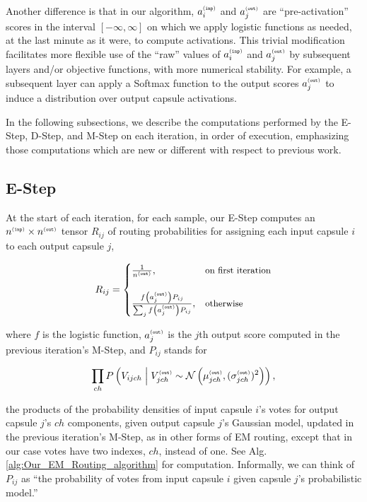 \documentclass[11pt,a4paper]{article}
\begin{document}
Another difference is that in our algorithm, $a^{{\scriptscriptstyle\tt (inp)}}_i$ and $a^{{\scriptscriptstyle\tt (out)}}_j$ are ``pre-activation'' scores in the interval $[-\infty, \infty]$ on which we apply logistic functions as needed, at the last minute as it were, to compute activations. This trivial modification facilitates more flexible use of the ``raw'' values of $a^{{\scriptscriptstyle\tt (inp)}}_i$ and $a^{{\scriptscriptstyle\tt (out)}}_j$ by subsequent layers and/or objective functions, with more numerical stability. For example, a subsequent layer can apply a Softmax function to the output scores $a^{{\scriptscriptstyle\tt (out)}}_j$ to induce a distribution over output capsule activations.

In the following subsections, we describe the computations performed by the E-Step, D-Step, and M-Step on each iteration, in order of execution, emphasizing those computations which are new or different with respect to previous work.

\subsection{E-Step}\label{ssec:E_Step}

At the start of each iteration, for each sample, our E-Step computes an $n^{{\scriptscriptstyle\tt (inp)}} \times n^{{\scriptscriptstyle\tt (out)}}$ tensor $R_{ij}$ of routing probabilities for assigning each input capsule $i$ to each output capsule $j$,

\begin{equation}\label{eq:equation_for_R}
R_{ij} =
\begin{cases}
  \frac{1}{n^{{\scriptscriptstyle\tt (out)}}},
  & \text{\small on first iteration} \\
  \\
  \frac{f\left(a^{{\scriptscriptstyle\tt (out)}}_j\right) P_{ij}}
  {\sum_j f\left(a^{{\scriptscriptstyle\tt (out)}}_j\right) P_{ij}},
  & \text{\small otherwise}
\end{cases}
\end{equation}

where $f$ is the logistic function, $a^{{\scriptscriptstyle\tt (out)}}_j$ is the $j$th output score computed in the previous iteration's M-Step, and $P_{ij}$ stands for

\begin{equation}
\prod_{ch} P \left( V_{ijch} \; \middle| \; V^{{\scriptscriptstyle\tt (out)}}_{jch} \sim \mathcal{N} \left(\mu^{{\scriptscriptstyle\tt (out)}}_{jch}, (\sigma^{{\scriptscriptstyle\tt (out)}}_{jch})^2 \right) \right),
\end{equation}

the products of the probability densities of input capsule $i$'s votes for output capsule $j$'s $ch$ components, given output capsule $j$'s Gaussian model, updated in the previous iteration's M-Step, as in other forms of EM routing, except that in our case votes have two indexes, $ch$, instead of one. See Alg. \ref{alg:Our_EM_Routing_algorithm} for computation. Informally, we can think of $P_{ij}$ as ``the probability of votes from input capsule $i$ given capsule $j$'s probabilistic model.''
\end{document}
